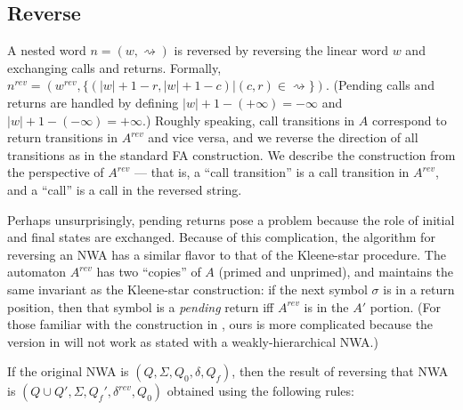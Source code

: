 

\subsection{Reverse}
\label{Se:Reverse}

A nested word $n = (w, \rightsquigarrow)$ is reversed by reversing the linear
word $w$ and exchanging calls and returns. Formally,
$n^{rev} = (w^{rev}, \{(|w|+1-r, |w|+1-c) | (c,r)
\in\rightsquigarrow\})$. (Pending calls and returns are handled by defining
$|w|+1-(+\infty) = -\infty$ and $|w|+1-(-\infty) = +\infty$.) Roughly
speaking, call transitions in $A$ correspond to return transitions in
$A^{rev}$ and vice versa, and we reverse the direction of all transitions as
in the standard FA construction. We describe the construction from the
perspective of $A^{rev}$ --- that is, a ``call transition'' is a call
transition in $A^{rev}$, and a ``call'' is a call in the reversed string.

Perhaps unsurprisingly, pending returns pose a problem because the
role of initial and final states are exchanged. Because of this complication,
the algorithm for reversing an NWA has a similar flavor to that of the
Kleene-star procedure. The automaton $A^{rev}$ has two ``copies'' of $A$
(primed and unprimed), and maintains the same invariant as the Kleene-star
construction: if
the next symbol $\sigma$ is in a return position, then that symbol is a
\emph{pending} return iff $A^{rev}$ is in the $A'$ portion.
(For those familiar with the construction in \cite{JACM:AM2009}, ours is more
complicated because the version in \cite{JACM:AM2009} will not work as stated
with a weakly-hierarchical NWA.)

If the original NWA is $(Q, \Sigma, Q_0, \delta, Q_f)$, then the result of
reversing that NWA is $(Q \cup Q', \Sigma, Q_f', \delta^{rev}, Q_0)$ obtained using
the following rules:

